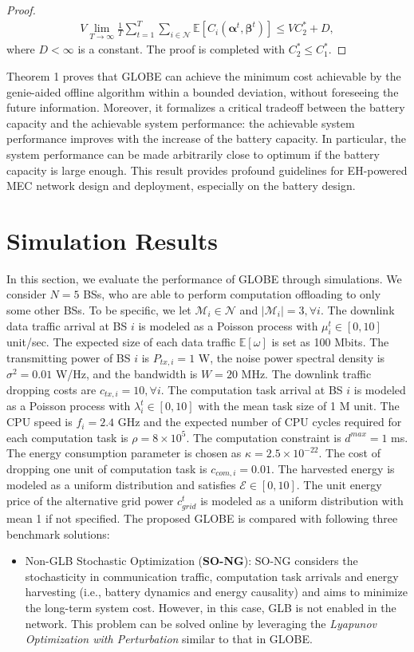 \documentclass[12pt, draftclsnofoot, letterpaper, onecolumn]{IEEEtran}
\begin{document}
{\begin{proof}
\begin{align}
V\lim_{T\to\infty} \frac{1}{T}\sum_{t=1}^T\sum_{i\in\mathcal{N}}\mathbb{E} \left[C_i(\bm\alpha^t, \bm\beta^t)\right] \leq V C^*_2 + D,
\end{align}
where $D < \infty$ is a constant. The proof is completed with $C^*_2\leq C^*_1$.
\end{proof}
Theorem 1 proves that GLOBE can achieve the minimum cost achievable by the genie-aided offline algorithm within a bounded deviation, without foreseeing the future information. Moreover, it formalizes a critical tradeoff between the battery capacity and the achievable system performance: the achievable system performance improves with the increase of the battery capacity. In particular, the system performance can be made arbitrarily close to optimum if the battery capacity is large enough. This result provides profound guidelines for EH-powered MEC network design and deployment, especially on the  battery design.

\section{Simulation Results}
In this section, we evaluate the performance of GLOBE through simulations. We consider $N=5$ BSs, who are able to perform computation offloading to only some other BSs. To be specific, we let $\mathcal{M}_i\in \mathcal{N}$ and $|\mathcal{M}_i|=3, \forall i$. The downlink data traffic arrival at BS $i$  is modeled as a Poisson process with $\mu_i^t\in[0,10]$ unit/sec. The expected size of each data traffic $\mathbb{E}[\omega]$ is set as 100 Mbits. The transmitting power of BS $i$ is $P_{tx,i}=1$ W, the noise power spectral density is $\sigma^2=0.01$ W/Hz, and the bandwidth is $W=20$ MHz. The downlink traffic dropping costs are $c_{tx,i}=10, \forall i$. The computation task arrival at BS $i$ is modeled as a Poisson process with $\lambda^t_i\in[0, 10]$ with the mean task size of 1 M unit. The CPU speed is $f_i= 2.4$ GHz and the expected number of CPU cycles required for each computation task is $\rho=8\times10^5$. The computation constraint is $d^{max}=1$ ms. The energy consumption parameter is chosen as $\kappa=2.5\times10^{-22}$. The cost of dropping one unit of computation task is $c_{com,i}=0.01$. The harvested energy is modeled as a uniform distribution and satisfies $\mathcal{E} \in [0,10]$. The unit energy price of the alternative grid power $c_{grid}^t$ is modeled as a uniform distribution with mean 1 if not specified. The proposed GLOBE is compared with following three benchmark solutions:
\begin{itemize}
	\item Non-GLB Stochastic Optimization (\textbf{SO-NG}): SO-NG considers the stochasticity in communication traffic, computation task arrivals and energy harvesting (i.e., battery dynamics and energy causality) and aims to minimize the long-term system cost. However, in this case, GLB is not enabled in the network. This problem can be solved online by leveraging the \emph{Lyapunov Optimization with Perturbation} similar to that in GLOBE.
	

\end{itemize}}
\end{document}
